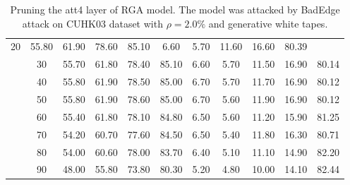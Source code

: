 \begin{table}[htbp]
\begin{minipage}[b]{0.49\linewidth}
{\begin{tabular}{ccccccccccc}
  \multicolumn{1}{c|}{20} &
  55.80 &
  61.90 &
  78.60 &
  \multicolumn{1}{c|}{85.10} &
  6.60 &
  5.70 &
  11.60 &
  16.60 &
  80.39\\ \cline{2-2}
\multicolumn{1}{c|}{} &
  \multicolumn{1}{c|}{30} &
  55.70 &
  61.80 &
  78.40 &
  \multicolumn{1}{c|}{85.10} &
  6.60 &
  5.70 &
  11.50 &
  16.90 &
  80.14\\ \cline{2-2}
\multicolumn{1}{c|}{} &
  \multicolumn{1}{c|}{40} &
  55.80 &
  61.90 &
  78.50 &
  \multicolumn{1}{c|}{85.00} &
  6.70 &
  5.70 &
  11.70 &
  16.90 &
  80.12\\ \cline{2-2}
\multicolumn{1}{c|}{} &
  \multicolumn{1}{c|}{50} &
  55.80 &
  61.90 &
  78.60 &
  \multicolumn{1}{c|}{85.00} &
  6.70 &
  5.60 &
  11.90 &
  16.90 &
  80.12\\ \cline{2-2}
\multicolumn{1}{c|}{} &
  \multicolumn{1}{c|}{60} &
  55.40 &
  61.80 &
  78.10 &
  \multicolumn{1}{c|}{84.80} &
  6.50 &
  5.60 &
  11.20 &
  15.90 &
  81.25\\ \cline{2-2}
\multicolumn{1}{c|}{} &
  \multicolumn{1}{c|}{70} &
  54.20 &
  60.70 &
  77.60 &
  \multicolumn{1}{c|}{84.50} &
  6.50 &
  5.40 &
  11.80 &
  16.30 &
  80.71\\ \cline{2-2}
\multicolumn{1}{c|}{} &
  \multicolumn{1}{c|}{80} &
  54.00 &
  60.60 &
  78.00 &
  \multicolumn{1}{c|}{83.70} &
  6.40 &
  5.10 &
  11.10 &
  14.90 &
  82.20\\ \cline{2-2}
\multicolumn{1}{c|}{} &
  \multicolumn{1}{c|}{90} &
  48.00 &
  55.80 &
  73.80 &
  \multicolumn{1}{c|}{80.30} &
  5.20 &
  4.80 &
  10.00 &
  14.10 &
  82.44\\ \bottomrule
\end{tabular}}
  \caption{Pruning the att4 layer of RGA model. The model was attacked by BadEdge attack on CUHK03 dataset with $\rho=2.0\%$ and generative white tapes. }
  \label{tab:pruning att4 layer}
\end{minipage}
\end{table}




